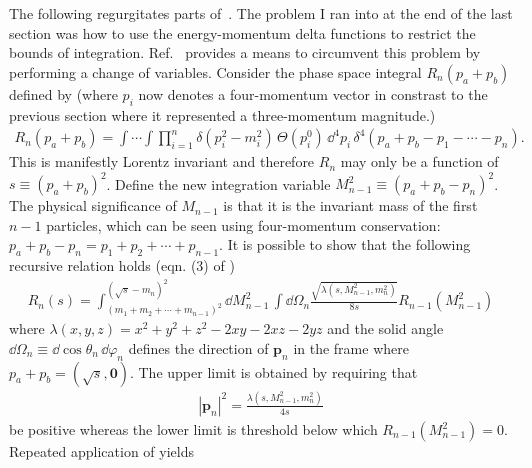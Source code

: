 \label{subsec:recursive-relation}
The following regurgitates parts of~\cite{Byckling:1969sx,Isaacson:2021xty}.
The problem I ran into at the end of the last section was how to use the energy-momentum delta functions to restrict the bounds of integration. Ref.~\cite{Byckling:1969sx} provides a means to circumvent this problem by performing a change of variables. 
Consider the phase space integral $R_n(p_a + p_b)$ defined by (where $p_i$ now denotes a four-momentum vector in constrast to the previous section where it represented a three-momentum magnitude.)
\begin{align}
    R_n(p_a + p_b) = 
    \int \cdots \int \prod_{i=1}^{n} \delta (p_i^2 - m_i^2) \, \Theta(p_i^0) \, 
    \dd^4 p_i \, \delta^4(p_a + p_b - p_1 - \cdots - p_n).
\end{align}
This is manifestly Lorentz invariant and therefore $R_n$ may only be a function of $s \equiv (p_a + p_b)^2$. 
Define the new integration variable $M_{n-1}^2 \equiv (p_a + p_b - p_n)^2$. The physical significance of $M_{n-1}$ is that it is the invariant mass of the first $n-1$ particles, which can be seen using four-momentum conservation: $p_a + p_b - p_n = p_1 + p_2 + \cdots + p_{n-1}$.
It is possible to show that the following recursive relation holds (eqn. (3) of \cite{Byckling:1969sx})
\begin{align}
    \label{eq:recursive-phase-space-relation}
    R_n(s) = 
    \int_{(m_1 + m_2 + \cdots + m_{n-1})^2}^{(\sqrt{s} - m_n)^2} 
    \dd M^2_{n-1} \, \int \dd \Omega_n
    \frac{\sqrt{\lambda(s, M_{n-1}^2, m_n^2)}}{8s} R_{n-1}(M_{n-1}^2)
\end{align}
where $\lambda(x, y, z) = x^2 + y^2 + z^2 - 2 xy - 2 xz - 2yz$ and the solid angle $\dd \Omega_n \equiv \dd \cos \theta_n\, \dd \varphi_n$ defines the direction of $\bm{p}_n$ in the frame where $p_a + p_b = (\sqrt{s}, \bm{0})$. 
The upper limit is obtained by requiring that 
\begin{align}
    |\bm{p}_n|^2 = \frac{\lambda(s, M_{n-1}^2, m_n^2)}{4 s}
\end{align}
be positive whereas the lower limit is threshold below which $R_{n-1}(M_{n-1}^2) = 0$\footnotemark. 
Repeated application of  yields 
